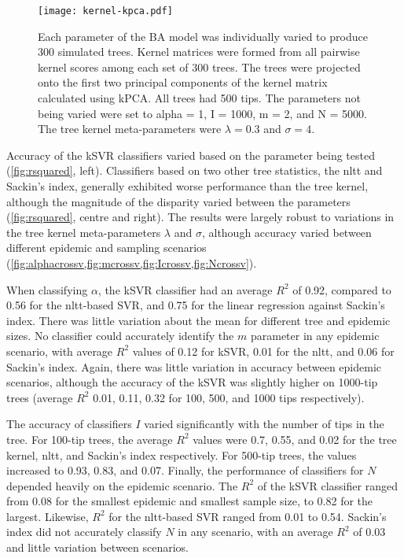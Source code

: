 \begin{figure}[ht]
  \centering
  \texttt{[image: kernel-kpca.pdf]}
  \caption[Kernel-PCA projections of simulated trees under varying BA
           parameter values.]{
    Each parameter of the \gls{BA} model was individually varied to produce 300
    simulated trees. Kernel matrices were formed from all pairwise kernel
    scores among each set of 300 trees. The trees were projected onto the first
    two principal components of the kernel matrix calculated using \gls{kPCA}.
    All trees had 500 tips. The parameters not being varied were set to
    \gls{alpha} = 1, \gls{I} = 1000, \gls{m} = 2, and \gls{N} = 5000. The tree
    kernel meta-parameters were $\lambda = 0.3$ and $\sigma = 4$.
  }
  \label{fig:kpca}
\end{figure}



Accuracy of the \gls{kSVR} classifiers varied based on the parameter being
tested (\cref{fig:rsquared}, left). Classifiers based on two other tree
statistics, the \gls{nltt} and Sackin's index, generally exhibited worse
performance than the tree kernel, although the magnitude of the disparity
varied between the parameters (\cref{fig:rsquared}, centre and right). The
results were largely robust to variations in the tree kernel meta-parameters
$\lambda$ and $\sigma$, although accuracy varied between different epidemic and
sampling scenarios
(\cref{fig:alphacrossv,fig:mcrossv,fig:Icrossv,fig:Ncrossv}).

When classifying $\alpha$, the \gls{kSVR} classifier had an average $R^2$ of 
    0.92,
compared to 
    0.56
for the \gls{nltt}-based SVR, and
    0.75
for the linear regression against Sackin's index. There was little variation
about the mean for different tree and epidemic sizes. No classifier could
accurately identify the $m$ parameter in any epidemic scenario, with average
$R^2$ values of 
  0.12 for \gls{kSVR},
  0.01 for the \gls{nltt}, and
  0.06
for Sackin's index. Again, there was little variation in accuracy between
epidemic scenarios, although the accuracy of the \gls{kSVR} was slightly higher
on 1000-tip trees 
    (average $R^2$ 
     0.01,
     0.11,
     0.32
     for 100, 500, and 1000 tips respectively).

The accuracy of classifiers $I$ varied significantly with the number of tips in
the tree. For 100-tip trees, the average $R^2$ values were
  0.7,
  0.55, and
  0.02
for the tree kernel, \gls{nltt}, and Sackin's index respectively. For 500-tip
trees, the values increased to
  0.93,
  0.83, and
  0.07.
Finally, the performance of classifiers for $N$ depended heavily on the
epidemic scenario. The $R^2$ of the \gls{kSVR} classifier ranged from
  0.08
for the smallest epidemic and smallest sample size, to
  0.82
for the largest. Likewise, $R^2$ for the \gls{nltt}-based SVR ranged from 
  0.01
to
  0.54.
Sackin's index did not accurately classify $N$ in any scenario, with an average
$R^2$ of
  0.03
and little variation between scenarios.

